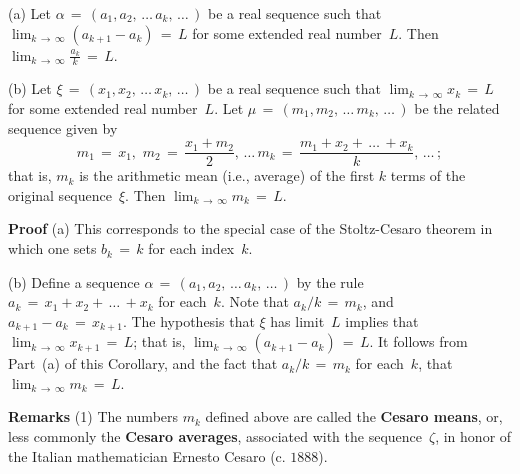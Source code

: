 \V

\hspace*{\parindent}(a) Let ${\alpha} \,=\, (a_{1}, a_{2},\,{\ldots}\,a_{k},\,{\ldots}\,)$
    be a real sequence such that $\lim_{k \,{\rightarrow}\, {\infty}} (a_{k+1}-a_{k}) \,=\, L$ for some extended real number~$L$.
    Then ${\displaystyle \lim_{k \,{\rightarrow}\, {\infty}} \frac{a_{k}}{k} \,=\, L}$.

\V

        (b) Let ${\xi} \,=\, (x_{1}, x_{2},\,{\ldots}\,x_{k},\,{\ldots}\,)$ be a real sequence such that
    $\lim_{k \,{\rightarrow}\, {\infty}} x_{k} \,=\, L$ for some extended real number~$L$.
    Let ${\mu} \,=\, (m_{1}, m_{2},\,{\ldots}\,m_{k},\,{\ldots}\,)$ be the related sequence given by
        \begin{displaymath}
        m_{1} \,=\, x_{1},\, \,m_{2} \,=\, \frac{x_{1}+m_{2}}{2},\,{\ldots}\,m_{k} \,=\, \frac{m_{1} + x_{2}+\,{\ldots}\,+x_{k}}{k},\,{\ldots}\,;
        \end{displaymath}
    that is, $m_{k}$ is the arithmetic mean (i.e., average) of the first $k$ terms of the original sequence~${\xi}$.
    Then $\lim_{k \,{\rightarrow}\, {\infty}} m_{k} \,=\, L$.

\V

        {\bf Proof} (a) This corresponds to the special case of the Stoltz-Cesaro theorem in which one sets $b_{k} \,=\, k$ for each index~$k$.

\V

        (b) Define a sequence ${\alpha} \,=\, (a_{1}, a_{2},\,{\ldots}\,a_{k},\,{\ldots}\,)$
    by the rule $a_{k} \,=\, x_{1} + x_{2} + \,{\ldots}\,+ x_{k}$ for each~$k$. Note that $a_{k}/k \,=\, m_{k}$, and $a_{k+1}-a_{k} \,=\, x_{k+1}$. 
    The hypothesis that ${\xi}$ has limit~$L$ implies that $\lim_{k \,{\rightarrow}\, {\infty}} x_{k+1} \,=\, L$;
    that is, $\lim_{k \,{\rightarrow}\, {\infty}} (a_{k+1}-a_{k}) \,=\, L$. It follows from Part~(a) of this Corollary,
    and the fact that $a_{k}/k \,=\, m_{k}$ for each~$k$, that $\lim_{k \,{\rightarrow}\, {\infty}} m_{k} \,=\, L$.

\V


        {\bf Remarks} (1) The numbers $m_{k}$ defined above are called the {\bf Cesaro means},
    or, less commonly the {\bf Cesaro averages},
    associated with the sequence~${\zeta}$, in honor of the Italian mathematician Ernesto Cesaro (c. $1888$).

\V


